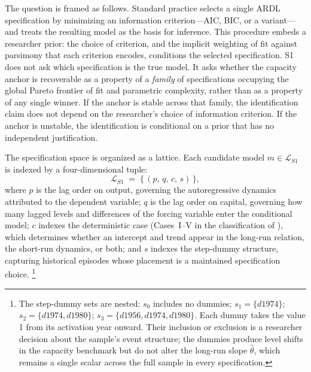 \documentclass[11pt,a4paper]{article}
\begin{document}
The question is framed as follows. Standard practice selects a single ARDL
specification by minimizing an information criterion---AIC, BIC, or a
variant---and treats the resulting model as the basis for inference. This
procedure embeds a researcher prior: the choice of criterion, and the
implicit weighting of fit against parsimony that each criterion encodes,
conditions the selected specification. S1 does not ask which specification is
the true model. It asks whether the capacity anchor is recoverable as a
property of a \emph{family} of specifications occupying the global Pareto
frontier of fit and parametric complexity, rather than as a property of any
single winner. If the anchor is stable across that family, the identification
claim does not depend on the researcher's choice of information criterion. If
the anchor is unstable, the identification is conditional on a prior that has
no independent justification.


The specification space is organized as a lattice. Each candidate model
$m \in \mathcal{L}_{S1}$ is indexed by a four-dimensional tuple:
%
\begin{equation}
	\label{eq:S1_lattice}
	\mathcal{L}_{S1} \;=\; \bigl\{\,(p,\, q,\, c,\, s)\,\bigr\},
\end{equation}
%
where $p$ is the lag order on output, governing the autoregressive dynamics
attributed to the dependent variable; $q$ is the lag order on capital,
governing how many lagged levels and differences of the forcing variable enter
the conditional model; $c$ indexes the deterministic case (Cases~I--V in the
classification of \citealt{Pesaran2001}), which determines whether
an intercept and trend appear in the long-run relation, the short-run
dynamics, or both; and $s$ indexes the step-dummy structure, capturing
historical episodes whose placement is a maintained specification choice.%
\footnote{The step-dummy sets are nested: $s_0$ includes no dummies;
	$s_1 = \{d1974\}$; $s_2 = \{d1974, d1980\}$;
	$s_3 = \{d1956, d1974, d1980\}$. Each dummy takes the value 1 from its
	activation year onward. Their inclusion or exclusion is a researcher
	decision about the sample's event structure; the dummies produce level
	shifts in the capacity benchmark but do not alter the long-run slope
	$\hat{\theta}$, which remains a single scalar across the full sample in
	every specification.}
\end{document}
